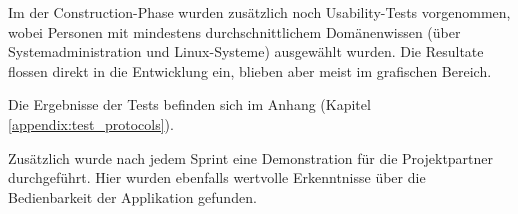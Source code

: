 Im der Construction-Phase wurden zusätzlich noch Usability-Tests vorgenommen, wobei Personen mit mindestens durchschnittlichem Domänenwissen (über Systemadministration und Linux-Systeme) ausgewählt wurden. Die Resultate flossen direkt in die Entwicklung ein, blieben aber meist im grafischen Bereich.

Die Ergebnisse der Tests befinden sich im Anhang (Kapitel \ref{appendix:test_protocols}).

Zusätzlich wurde nach jedem Sprint eine Demonstration für die Projektpartner durchgeführt. Hier wurden ebenfalls wertvolle Erkenntnisse über die Bedienbarkeit der Applikation gefunden.